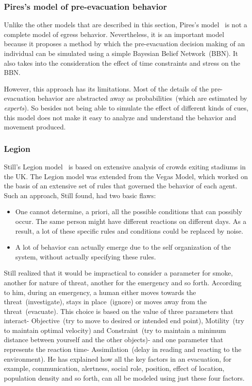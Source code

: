 \subsubsection{Pires's model of pre-evacuation behavior}

Unlike the other models that are described in this section, Pires's model~\cite{Pires:2005gs} is not a complete model of egress behavior. Nevertheless, it is an important model because it proposes a method by which the pre-evacuation decision making of an individual can be simulated using a simple Bayesian Belief Network~(BBN). It also takes into the consideration the effect of time constraints and stress on the BBN.

However, this approach has its limitations. Most of the details of the pre-evacuation behavior are abstracted away as probabilities~(which are estimated by \emph{experts}). So besides not being able to simulate the effect of different kinds of cues, this model does not make it easy to analyze and understand the behavior and movement produced.

\subsubsection{Legion}

Still's Legion model~\cite{Still:2000tp} is based on extensive analysis of crowds exiting stadiums in the UK. The Legion model was extended from the Vegas Model, which worked on the basis of an extensive set of rules that governed the behavior of each agent. Such an approach, Still found, had two basic flaws:
\begin{itemize}
\item One cannot determine, a priori, all the possible conditions that can possibly occur. The same person might have different reactions on different days. As a result, a lot of these specific rules and conditions could be replaced by noise.
\item A lot of behavior can actually emerge due to the self organization of the system, without actually specifying these rules.
\end{itemize}
Still realized that it would be impractical to consider a parameter for smoke, another for nature of threat, another for the emergency and so forth. According to him, during an emergency, a human either moves towards the threat~(investigate), stays in place~(ignore) or moves away from the threat~(evacuate). This choice is based on the value of three parameters that interact- Objective~(try to move to desired or intended end point), Motility~(try to maintain optimal velocity) and Constraint~(try to maintain a minimum distance between yourself and the other objects)- and one parameter that represents the reaction time- Assimilation~(delay in reading and reacting to the environment). He has explained how all the key factors in an evacuation, for example, communication, alertness, social role, position, effect of location, population density and so forth, can all be modeled using just these four factors.

